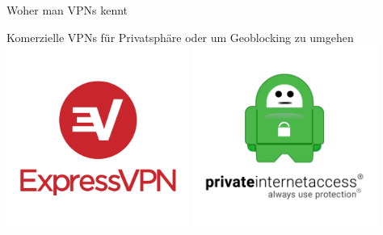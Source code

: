 \documentclass{beamer}
\begin{document}
  \begin{frame}{Woher man VPNs kennt}
    \begin{center}
      Komerzielle VPNs für Privatsphäre oder um Geoblocking zu umgehen \\
      \vspace{10pt}
      \includegraphics[width=0.45\textwidth]{expressvpn}
      \includegraphics[width=0.45\textwidth]{private-internet-access}
    \end{center}
  \end{frame}
\end{document}
